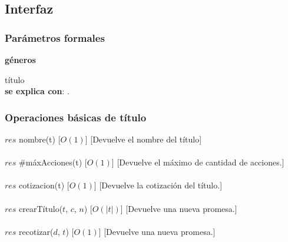 \subsection{Interfaz}

  \subsubsection{Par\'ametros formales}
   \parbox{1.7cm}{\textbf{g\'eneros}} t\'itulo\\
    
  \textbf{se explica con}: .


  \subsubsection{Operaciones b\'asicas de t\'itulo}

  {$res$ \igobs nombre(t)}
  [$O(1)$]
  [Devuelve el nombre del t\'itulo]\\\\

  {$res$ \igobs #m\'axAcciones(t)}
  [$O(1)$]
  [Devuelve el m\'aximo de cantidad de acciones.]\\\\

  {$res$ \igobs cotizacion(t)}
  [$O(1)$]
  [Devuelve la cotizaci\'on del t\'itulo.]\\\\


  {$res$ \igobs crearT\'itulo($t$, $c$, $n$)}
  [$O(|t|)$]
  [Devuelve una nueva promesa.]\\\\

  {$res$ \igobs recotizar($d$, $t$)}
  [$O(1)$]
  [Devuelve una nueva promesa.]\\\\


